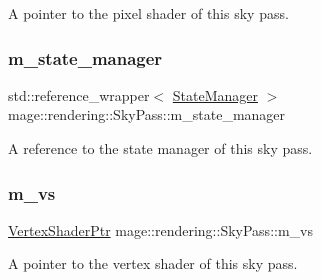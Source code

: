 A pointer to the pixel shader of this sky pass. \hypertarget{classmage_1_1rendering_1_1_sky_pass_aed4f451eb046158e856fdda6de9856f5}{}\label{classmage_1_1rendering_1_1_sky_pass_aed4f451eb046158e856fdda6de9856f5} 
\subsubsection{\texorpdfstring{m\+\_\+state\+\_\+manager}{m\_state\_manager}}
{\footnotesize\ttfamily std\+::reference\+\_\+wrapper$<$ \hyperlink{classmage_1_1rendering_1_1_state_manager}{State\+Manager} $>$ mage\+::rendering\+::\+Sky\+Pass\+::m\+\_\+state\+\_\+manager\hspace{0.3cm}{\ttfamily [private]}}

A reference to the state manager of this sky pass. \hypertarget{classmage_1_1rendering_1_1_sky_pass_a935019dff57aaf9ae91f974ec59f11ee}{}\label{classmage_1_1rendering_1_1_sky_pass_a935019dff57aaf9ae91f974ec59f11ee} 
\subsubsection{\texorpdfstring{m\+\_\+vs}{m\_vs}}
{\footnotesize\ttfamily \hyperlink{namespacemage_1_1rendering_aaf704b9c54a4181f4950a1761de69dda}{Vertex\+Shader\+Ptr} mage\+::rendering\+::\+Sky\+Pass\+::m\+\_\+vs\hspace{0.3cm}{\ttfamily [private]}}

A pointer to the vertex shader of this sky pass. 